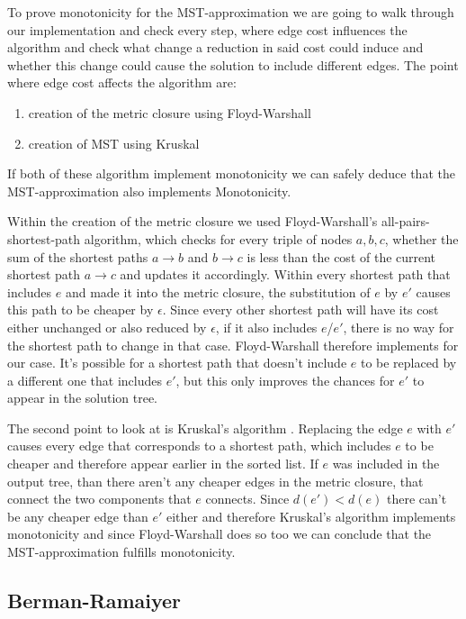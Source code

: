 To prove monotonicity for the MST-approximation we are going to walk through our implementation and check every step, where edge cost influences the algorithm and check what change a reduction in said cost could induce and whether this change could cause the solution to include different edges.
The point where edge cost affects the algorithm are:
\begin{enumerate}
\item creation of the metric closure using Floyd-Warshall 
\item creation of MST using Kruskal
\end{enumerate}
If both of these algorithm implement monotonicity we can safely deduce that the MST-approximation also implements Monotonicity.

Within the creation of the metric closure we used Floyd-Warshall's all-pairs-shortest-path algorithm, which checks for every triple of nodes $a,b,c$, whether the sum of the shortest paths $a\to b$ and $b\to c$ is less than the cost of the current shortest path $a\to c$ and updates it accordingly. Within every shortest path that includes $e$ and made it into the metric closure, the substitution of $e$ by $e'$ causes this path to be cheaper by $\epsilon$. Since every other shortest path will have its cost either unchanged or also reduced by $\epsilon$, if it also includes $e$/$e'$, there is no way for the shortest path to change in that case. Floyd-Warshall therefore implements for our case. It's possible for a shortest path that doesn't include $e$ to be replaced by a different one that includes $e'$, but this only improves the chances for $e'$ to appear in the solution tree.

The second point to look at is Kruskal's algorithm \cite{kruskal1956shortest}. Replacing the edge $e$ with $e'$ causes every edge that corresponds to a shortest path, which includes $e$ to be cheaper and therefore appear earlier in the sorted list. If $e$ was included in the output tree, than there aren't any cheaper edges in the metric closure, that connect the two components that $e$ connects. Since $d(e')<d(e)$ there can't be any cheaper edge than $e'$ either and therefore Kruskal's algorithm implements monotonicity and since Floyd-Warshall does so too we can conclude that the MST-approximation fulfills monotonicity.

\subsection{Berman-Ramaiyer}

